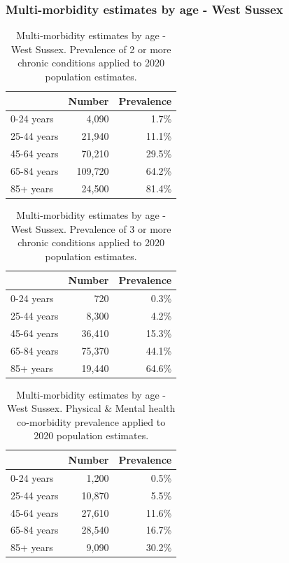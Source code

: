 \subsubsection{Multi-morbidity estimates by age - West Sussex}
\begin{table}
    \caption{Multi-morbidity estimates by age - West Sussex. Prevalence of 2 or more chronic conditions applied to 2020 population estimates.}
    \centering
    \begin{tabular}{lrr}
        \toprule
        \ & Number & Prevalence \\
        \midrule
        0-24 years & 4,090 & 1.7\% \\
        25-44 years & 21,940 & 11.1\% \\
        45-64 years & 70,210 & 29.5\% \\
        65-84 years & 109,720 & 64.2\% \\
        85+ years & 24,500 & 81.4\% \\
        \bottomrule
    \end{tabular}
    \label{tab:op:2_plus_conds}
\end{table}

\begin{table}
    \caption{Multi-morbidity estimates by age - West Sussex. Prevalence of 3 or more chronic conditions applied to 2020 population estimates.}
    \centering
    \begin{tabular}{lrr}
        \toprule
        \ & Number & Prevalence \\
        \midrule
        0-24 years & 720 & 0.3\% \\
        25-44 years & 8,300 & 4.2\% \\
        45-64 years & 36,410 & 15.3\% \\
        65-84 years & 75,370 & 44.1\% \\
        85+ years & 19,440 & 64.6\% \\
        \bottomrule
    \end{tabular}
    \label{tab:op:3_plus_conds}
\end{table}

\begin{table}
    \caption{Multi-morbidity estimates by age - West Sussex. Physical \& Mental health co-morbidity prevalence applied to 2020 population estimates.}
    \centering
    \begin{tabular}{lrr}
        \toprule
        \ & Number & Prevalence \\
        \midrule
        0-24 years & 1,200 & 0.5\% \\
        25-44 years & 10,870 & 5.5\% \\
        45-64 years & 27,610 & 11.6\% \\
        65-84 years & 28,540 & 16.7\% \\
        85+ years & 9,090 & 30.2\% \\
        \bottomrule
    \end{tabular}
    \label{tab:op:m_and_p}
\end{table}

